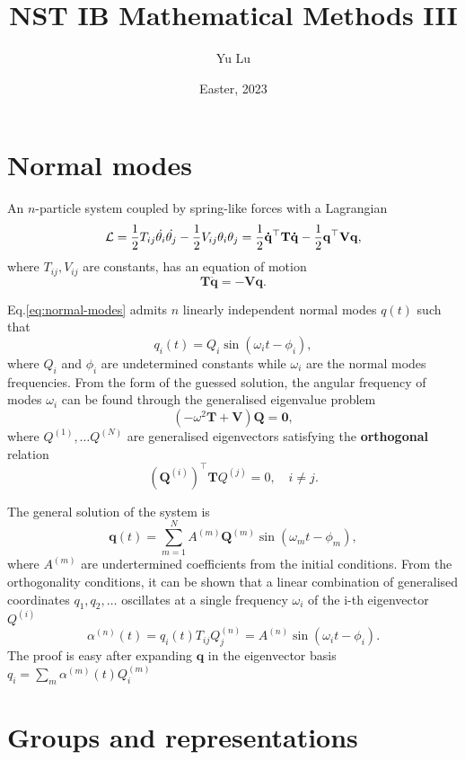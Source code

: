 \documentclass{article}
\title{NST IB Mathematical Methods III}
\date{Easter, 2023}
\author{Yu Lu}
\begin{document}
\maketitle
\tableofcontents
\section{Normal modes}
An $n$-particle system coupled by spring-like forces with a Lagrangian
\[
    \mathcal{\MakeUppercase{l}} = \frac{1}{2} T_{ij} \dot{\theta_i} \dot{\theta_j} - \frac{1}{2} V_{ij} \theta_i \theta_j = \frac{1}{2} \mathbf{\dot{q} ^{\top}} \mathbf{T} \mathbf{\dot{q} } -   \frac{1}{2} \mathbf{q ^{\top}} \mathbf{V} \mathbf{q }, 
\]
where $T_{ij}, V_{ij} $ are constants, has an equation of motion
\begin{equation}
    \label{eq:normal-modes}
    \mathbf{T} \ddot{\mathbf{q} } = - \mathbf{V} \mathbf{q}. 
\end{equation}

Eq.\eqref{eq:normal-modes} admits $n$ linearly independent normal modes $q(t)$ such that
\[
    q_i(t) = Q_i \sin( \omega_i t - \phi_i), 
\]
where $Q_i$ and $\phi_i$ are undetermined constants while $\omega_i$ are the normal modes frequencies. From the form of the guessed solution, the angular frequency of modes $\omega_i$ can be found through the generalised eigenvalue problem 
\[
    \boxed{
        (-\omega ^{2} \mathbf{T} + \mathbf{V} ) \mathbf{Q} = \textbf{0},
    }
\]
where $Q^{(1)}, \ldots Q^{(N)} $ are generalised eigenvectors satisfying the \textbf{orthogonal} relation
\[
    (\mathbf{Q}^{(i)})^{\top} \mathbf{T} Q^{(j)} = 0, \quad i \neq j. 
\]

The general solution of the system is
\[
    \mathbf{q}(t) = \sum_{m=1}^{N} A^{(m)} \mathbf{Q}^{(m)} \sin(\omega_m t - \phi_m),
\]
where $A^{(m)}$ are undertermined coefficients from the initial conditions. From the orthogonality conditions, it can be shown that a linear combination of generalised coordinates $q_1, q_2, \ldots $ oscillates at a single frequency $\omega_i$ of the i-th eigenvector $Q^{(i)}$
\[
    \boxed{\alpha^{(n)}(t) = q_i (t) T_{ij} Q_{j}^{(n)} } = A^{(n)} \sin(\omega_i t - \phi_i). 
\]
The proof is easy after expanding $\mathbf{q}$ in the eigenvector basis $q_i = \sum_{m} \alpha^{(m)}(t) Q_i^{(m)} $
\section{Groups and representations}
\end{document}
